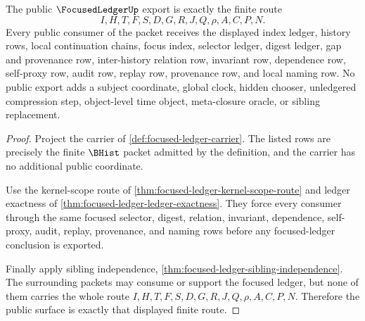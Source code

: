 \begin{theorem}
\label{thm:focused-ledger-public-export-surface}
The public $\FocusedLedgerUp$ export is exactly the finite route
$$
I,H,T,F,S,D,G,R,J,Q,\rho,A,C,P,N .
$$
Every public consumer of the packet receives the displayed index ledger, history rows, local continuation chains, focus index, selector ledger, digest ledger, gap and provenance row, inter-history relation row, invariant row, dependence row, self-proxy row, audit row, replay row, provenance row, and local naming row. No public export adds a subject coordinate, global clock, hidden chooser, unledgered compression step, object-level time object, meta-closure oracle, or sibling replacement.
\end{theorem}
\begin{proof}
Project the carrier of \autoref{def:focused-ledger-carrier}. The listed rows are precisely the finite $\BHist$ packet admitted by the definition, and the carrier has no additional public coordinate.

Use the kernel-scope route of \autoref{thm:focused-ledger-kernel-scope-route} and ledger exactness of \autoref{thm:focused-ledger-ledger-exactness}. They force every consumer through the same focused selector, digest, relation, invariant, dependence, self-proxy, audit, replay, provenance, and naming rows before any focused-ledger conclusion is exported.

Finally apply sibling independence, \autoref{thm:focused-ledger-sibling-independence}. The surrounding packets may consume or support the focused ledger, but none of them carries the whole route $I,H,T,F,S,D,G,R,J,Q,\rho,A,C,P,N$. Therefore the public surface is exactly that displayed finite route.
\end{proof}


